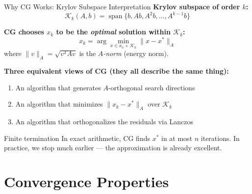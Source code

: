 \documentclass[aspectratio=169]{beamer}
\begin{document}
\begin{frame}{Why CG Works: Krylov Subspace Interpretation}
    \textbf{Krylov subspace of order $k$:}
    \[
        \mathcal{K}_k(A, b) = \operatorname{span}\{b, Ab, A^2 b, \ldots, A^{k-1} b\}
    \]

    \vspace{0.15cm}
    \textbf{CG chooses $x_k$ to be the \emph{optimal} solution within $\mathcal{K}_k$:}
    \[
        x_k = \arg\min_{x \in x_0 + \mathcal{K}_k} \|x - x^*\|_A
    \]
    where $\|v\|_A = \sqrt{v^T A v}$ is the \emph{$A$-norm} (energy norm).

    \pause
    \vspace{0.2cm}
    \textbf{Three equivalent views of CG (they all describe the same thing):}
    \begin{enumerate}
        \item An algorithm that generates $A$-orthogonal search directions
        \item An algorithm that minimizes $\|x_k - x^*\|_A$ over $\mathcal{K}_k$
        \item An algorithm that orthogonalizes the residuals via Lanczos
    \end{enumerate}

    \vspace{0.15cm}
    \begin{block}{Finite termination}
        In exact arithmetic, CG finds $x^*$ in at most $n$ iterations.
        In practice, we stop much earlier --- the approximation is already excellent.
    \end{block}
\end{frame}

\section{Convergence Properties}
\end{document}
